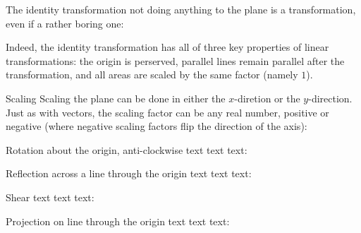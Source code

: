 \begin{descitemize}
	\item[The identity transformation] not doing anything to the plane is a transformation, even if a rather boring one:

	\begin{center}
	\end{center}

	Indeed, the identity transformation has all of three key properties of linear transformations: the origin is perserved, parallel lines remain parallel after the transformation, and all areas are scaled by the same factor (namely $1$).

	\item[Scaling] Scaling the plane can be done in either the $x$-diretion or the $y$-direction. Just as with vectors, the scaling factor can be any real number, positive or negative (where negative scaling factors flip the direction of the axis):

	\begin{center}

	\end{center}

	\item[Rotation about the origin, anti-clockwise] text text text:
	\begin{center}
	\end{center}

	\item[Reflection across a line through the origin] text text text:
	\begin{center}
	\end{center}

	\item[Shear] text text text:
	\begin{center}
	\end{center}

	\item[Projection on line through the origin] text text text:
	\begin{center}
	\end{center}


\end{descitemize}

